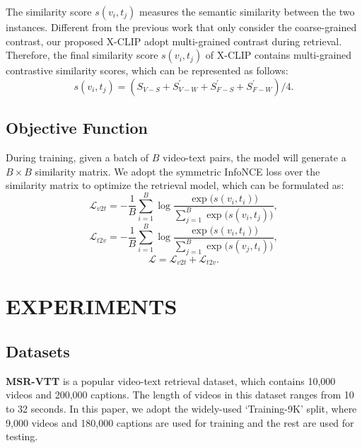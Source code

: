 \documentclass[sigconf]{acmart}
\begin{document}
The similarity score $s(v_i,t_j)$ measures the semantic similarity between the two instances. Different from the previous work \cite{luo2021clip4clip} that only consider the coarse-grained contrast, our proposed X-CLIP adopt multi-grained contrast during retrieval. Therefore, the final similarity score $s(v_i,t_j)$ of X-CLIP contains multi-grained contrastive similarity scores, which can be represented as follows:
\begin{equation}
    s(v_i,t_j)=(S_{V-S}+S^{\prime}_{V-W}+S^{\prime}_{F-S}+S^{\prime}_{F-W})/4.
\label{eq:simi}
\end{equation}

\subsection{Objective Function} \label{sec:objective}
During training, given a batch of $B$ video-text pairs, the model will generate a $B \times B$ similarity matrix. We adopt the symmetric InfoNCE loss over the similarity matrix to optimize the retrieval model, which can be formulated as:
\begin{equation}
    \mathcal{L}_{v 2 t}=-\frac{1}{B} \sum_{i=1}^{B} \log \frac{\exp \big(s(v_{i}, t_{i})\big)}{\sum_{j=1}^{B} \exp \big(s(v_{i}, t_{j})\big)},
\label{eq:t2v}
\end{equation}
\begin{equation}
    \mathcal{L}_{t 2 v}=-\frac{1}{B} \sum_{i=1}^{B} \log \frac{\exp \big(s(v_{i}, t_{i})\big)}{\sum_{j=1}^{B} \exp \big(s(v_{j}, t_{i})\big)},
\label{eq:v2t}
\end{equation}
\begin{equation}
    \mathcal{L}=\mathcal{L}_{v 2 t}+\mathcal{L}_{t 2 v}.
\label{eq:loss}
\end{equation}




\section{EXPERIMENTS}

\subsection{Datasets}

\noindent\textbf{MSR-VTT} \cite{xu2016msr} is a popular video-text retrieval dataset, which contains 10,000 videos and 200,000 captions. The length of videos in this dataset ranges from 10 to 32 seconds. In this paper, we adopt the widely-used `Training-9K' split, where 9,000 videos and 180,000 captions are used for training and the rest are used for testing.
\end{document}
